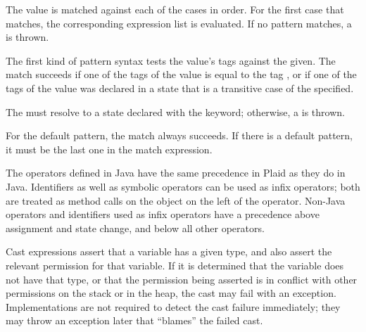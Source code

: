 The value is matched against each of the cases in order.  For the
first case that matches, the corresponding expression list is
evaluated.  If no pattern matches, a  is
thrown.

The first kind of pattern syntax tests the value's tags against
the  given.  The match succeeds if
one of the tags of the value is equal to the tag
, or if one of the tags of the value
was declared in a state that is a transitive case of the
 specified.

The 
must resolve to a state declared with the 
keyword; otherwise, a  is
thrown. 

For the default pattern, the match always succeeds.  If
there is a default pattern, it must be the last one in the match
expression.

\begin{quote}


 {}

 {}

 {}  



 {} \alt {}



 {} 

\end{quote}

The operators defined in Java have the same precedence in Plaid as
they do in Java.  Identifiers as well as symbolic operators can be
used as infix operators; both are treated as method calls on the
object on the left of the operator.  Non-Java operators and
identifiers used as infix operators have a precedence above assignment
and state change, and below all other operators.

Cast expressions assert that a variable has a given type, and
also assert the relevant permission for that variable.  If it is
determined that the variable does not have that type, or that the
permission being asserted is in conflict with other permissions on
the stack or in the heap, the cast may fail with an exception.
Implementations are not required to detect the cast failure
immediately; they may throw an exception later that ``blames''
the failed cast.



